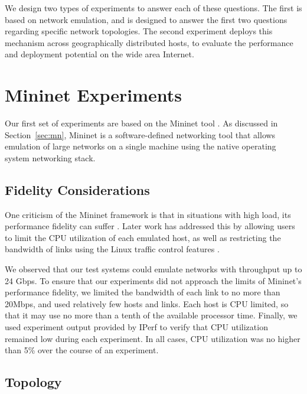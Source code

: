 \documentclass{cwru}
\begin{document}
We design two types of experiments to answer each of these questions. The first
is based on network emulation, and is designed to answer the first two questions
regarding specific network topologies. The second experiment deploys this
mechanism across geographically distributed hosts, to evaluate the performance
and deployment potential on the wide area Internet.

\section{Mininet Experiments}

Our first set of experiments are based on the Mininet tool \cite{mininet}. As
discussed in Section~\ref{sec:mn}, Mininet is a software-defined networking tool
that allows emulation of large networks on a single machine using the native
operating system networking stack.

\subsection{Fidelity Considerations}

One criticism of the Mininet framework is that in situations with high load, its
performance fidelity can suffer \cite{lantz2010network}. Later work has
addressed this by allowing users to limit the CPU utilization of each emulated
host, as well as restricting the bandwidth of links using the Linux traffic
control features \cite{handigol2012reproducible}.

We observed that our test systems could emulate networks with throughput up to
24 Gbps. To ensure that our experiments did not approach the limits of Mininet's
performance fidelity, we limited the bandwidth of each link to no more than
20Mbps, and used relatively few hosts and links. Each host is CPU limited, so
that it may use no more than a tenth of the available processor time. Finally,
we used experiment output provided by IPerf to verify that CPU utilization
remained low during each experiment. In all cases, CPU utilization was no higher
than 5\% over the course of an experiment.

\subsection{Topology}
\end{document}
